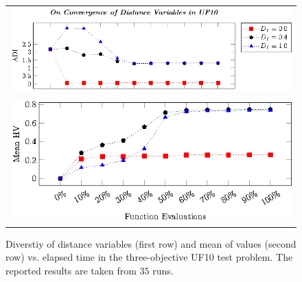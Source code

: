 \begin{figure}[t]
\centering
\begin{tabular}{l}
 \includegraphics[scale=0.8]{images/Diversity_Long_Term_tikz_UF10-figure0.eps}\\[0cm]%
 \includegraphics[scale=0.8]{images/Diversity_Long_Term_tikz_UF10-figure1.eps}\\[0cm]%
\end{tabular}
\caption{Diverstiy of distance variables (first row) and mean of \HV{} values (second row) vs. elapsed time in the three-objective UF10 test problem. The reported results are taken from $35$ runs.}\label{fig:UF10_Diversity}
\end{figure}

